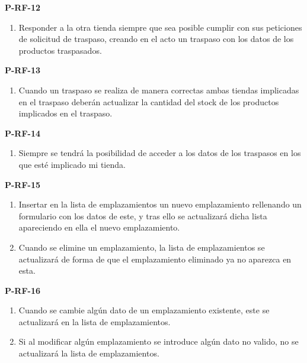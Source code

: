\textbf{P-RF-12}
\begin{enumerate}
	\item Responder a la otra tienda siempre que sea posible cumplir con sus peticiones de solicitud de traspaso, creando en el acto un traspaso con los datos de los productos traspasados.
\end{enumerate}

\textbf{P-RF-13}
\begin{enumerate}
	\item Cuando un traspaso se realiza de manera correctas ambas tiendas implicadas en el traspaso deberán actualizar la cantidad del stock de los productos implicados en el traspaso.
\end{enumerate}

\textbf{P-RF-14}
\begin{enumerate}
	\item Siempre se tendrá la posibilidad de acceder a los datos de los traspasos en los que esté implicado mi tienda.
\end{enumerate}

\textbf{P-RF-15}
\begin{enumerate}
	\item Insertar en la lista de emplazamientos un nuevo emplazamiento rellenando un formulario con los datos de este, y tras ello se actualizará dicha lista apareciendo en ella el nuevo emplazamiento.
	\item Cuando se elimine un emplazamiento, la lista de emplazamientos se actualizará de forma de que el emplazamiento eliminado ya no aparezca en esta.
\end{enumerate}

\textbf{P-RF-16}
\begin{enumerate}
	\item Cuando se cambie algún dato de un emplazamiento existente, este se actualizará en la lista de emplazamientos.
	\item Si al modificar algún emplazamiento se introduce algún dato no valido, no se actualizará la lista de emplazamientos.
\end{enumerate}

